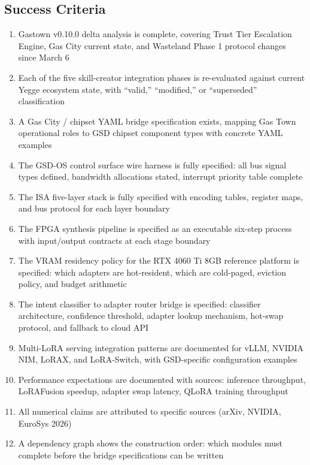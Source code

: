 \documentclass[11pt,letterpaper]{article}
\begin{document}
\subsection{Success Criteria}

\begin{enumerate}
  \item Gastown v0.10.0 delta analysis is complete, covering Trust Tier Escalation Engine, Gas City current state, and Wasteland Phase 1 protocol changes since March 6
  \item Each of the five skill-creator integration phases is re-evaluated against current Yegge ecosystem state, with ``valid,'' ``modified,'' or ``superseded'' classification
  \item A Gas City / chipset YAML bridge specification exists, mapping Gas Town operational roles to GSD chipset component types with concrete YAML examples
  \item The GSD-OS control surface wire harness is fully specified: all bus signal types defined, bandwidth allocations stated, interrupt priority table complete
  \item The ISA five-layer stack is fully specified with encoding tables, register maps, and bus protocol for each layer boundary
  \item The FPGA synthesis pipeline is specified as an executable six-step process with input/output contracts at each stage boundary
  \item The VRAM residency policy for the RTX 4060 Ti 8GB reference platform is specified: which adapters are hot-resident, which are cold-paged, eviction policy, and budget arithmetic
  \item The intent classifier to adapter router bridge is specified: classifier architecture, confidence threshold, adapter lookup mechanism, hot-swap protocol, and fallback to cloud API
  \item Multi-LoRA serving integration patterns are documented for vLLM, NVIDIA NIM, LoRAX, and LoRA-Switch, with GSD-specific configuration examples
  \item Performance expectations are documented with sources: inference throughput, LoRAFusion speedup, adapter swap latency, QLoRA training throughput
  \item All numerical claims are attributed to specific sources (arXiv, NVIDIA, EuroSys 2026)
  \item A dependency graph shows the construction order: which modules must complete before the bridge specifications can be written
\end{enumerate}
\end{document}
